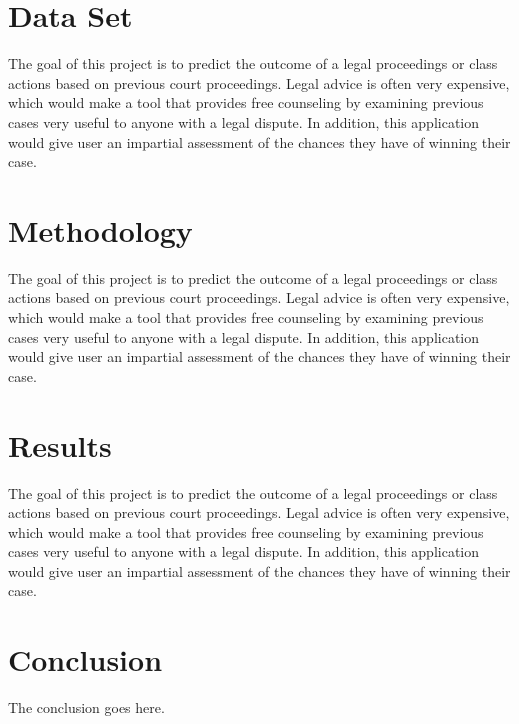 \documentclass[journal]{IEEEtran}
\begin{document}
\section{Data Set}
The goal of this project is to predict the outcome of a legal proceedings or class actions based on previous court proceedings. Legal advice is often very expensive, which would make a tool that provides free counseling by examining previous cases very useful to anyone with a legal dispute. In addition, this application would give user an impartial assessment of the chances they have of winning their case.

\section{Methodology}
The goal of this project is to predict the outcome of a legal proceedings or class actions based on previous court proceedings. Legal advice is often very expensive, which would make a tool that provides free counseling by examining previous cases very useful to anyone with a legal dispute. In addition, this application would give user an impartial assessment of the chances they have of winning their case.

\section{Results}
The goal of this project is to predict the outcome of a legal proceedings or class actions based on previous court proceedings. Legal advice is often very expensive, which would make a tool that provides free counseling by examining previous cases very useful to anyone with a legal dispute. In addition, this application would give user an impartial assessment of the chances they have of winning their case.

\section{Conclusion}
The conclusion goes here.
\end{document}
